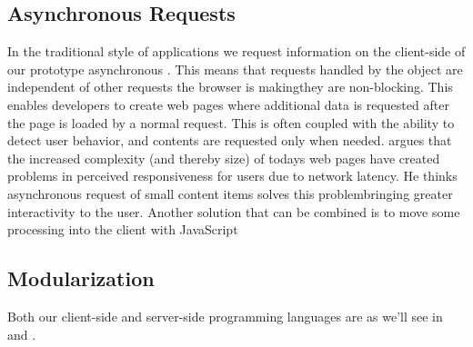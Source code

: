 \subsection{Asynchronous Requests}

In the traditional style of  applications we request information on
the client-side of our prototype asynchronous%
.
This means that requests handled by the  object
are independent of other requests the browser is making\dash{}they
are non-blocking. This enables developers to create web pages where additional
data is requested after the page is loaded by a normal  request.
This is often coupled with the ability to detect user behavior, and contents
are requested only when needed. \citet[pp.281--282]{stamey06} argues that
the increased complexity (and thereby size) of todays web pages have created
problems in perceived responsiveness for users due to network latency. He
thinks asynchronous request of small content items solves this
problem\dash{}bringing greater interactivity to the user. Another solution
that can be combined is to move some processing into the client with
JavaScript \citep[]{jazayeri07}

\subsection{Modularization}

Both our client-side and server-side programming languages are as we'll see in
 and
.

%

